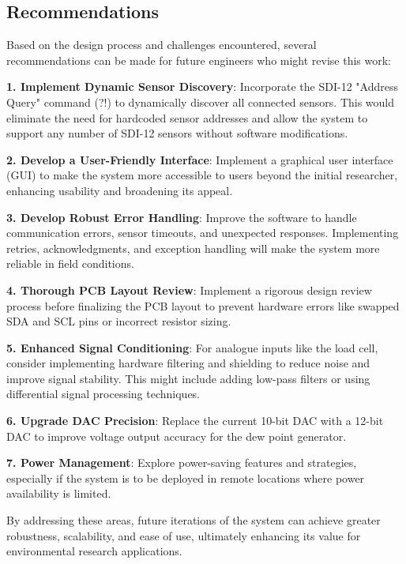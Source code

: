 \subsection{Recommendations}


Based on the design process and challenges encountered, several recommendations can be made for future engineers who might revise this work:

\textbf{1. Implement Dynamic Sensor Discovery}: Incorporate the SDI-12 "Address Query" command (?!) to dynamically discover all connected sensors. This would eliminate the need for hardcoded sensor addresses and allow the system to support any number of SDI-12 sensors without software modifications.

\textbf{2. Develop a User-Friendly Interface}: Implement a graphical user interface (GUI) to make the system more accessible to users beyond the initial researcher, enhancing usability and broadening its appeal.

\textbf{3. Develop Robust Error Handling}: Improve the software to handle communication errors, sensor timeouts, and unexpected responses. Implementing retries, acknowledgments, and exception handling will make the system more reliable in field conditions.

\textbf{4. Thorough PCB Layout Review}: Implement a rigorous design review process before finalizing the PCB layout to prevent hardware errors like swapped SDA and SCL pins or incorrect resistor sizing.

\textbf{5. Enhanced Signal Conditioning}: For analogue inputs like the load cell, consider implementing hardware filtering and shielding to reduce noise and improve signal stability. This might include adding low-pass filters or using differential signal processing techniques.

\textbf{6. Upgrade DAC Precision}: Replace the current 10-bit DAC with a 12-bit DAC to improve voltage output accuracy for the dew point generator.

\textbf{7. Power Management}: Explore power-saving features and strategies, especially if the system is to be deployed in remote locations where power availability is limited.

By addressing these areas, future iterations of the system can achieve greater robustness, scalability, and ease of use, ultimately enhancing its value for environmental research applications.